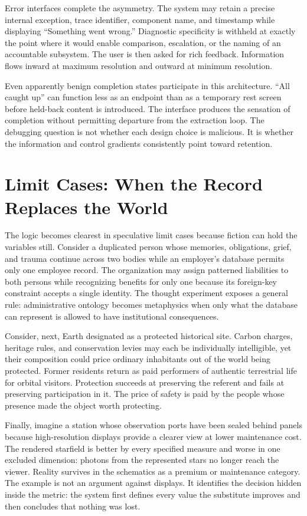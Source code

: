 \documentclass[11pt]{article}
\begin{document}
Error interfaces complete the asymmetry. The system may retain a precise internal exception, trace identifier, component name, and timestamp while displaying \enquote{Something went wrong.} Diagnostic specificity is withheld at exactly the point where it would enable comparison, escalation, or the naming of an accountable subsystem. The user is then asked for rich feedback. Information flows inward at maximum resolution and outward at minimum resolution.

Even apparently benign completion states participate in this architecture. \enquote{All caught up} can function less as an endpoint than as a temporary rest screen before held-back content is introduced. The interface produces the sensation of completion without permitting departure from the extraction loop. The debugging question is not whether each design choice is malicious. It is whether the information and control gradients consistently point toward retention.

\section{Limit Cases: When the Record Replaces the World}

The logic becomes clearest in speculative limit cases because fiction can hold the variables still. Consider a duplicated person whose memories, obligations, grief, and trauma continue across two bodies while an employer's database permits only one employee record. The organization may assign patterned liabilities to both persons while recognizing benefits for only one because its foreign-key constraint accepts a single identity. The thought experiment exposes a general rule: administrative ontology becomes metaphysics when only what the database can represent is allowed to have institutional consequences.

Consider, next, Earth designated as a protected historical site. Carbon charges, heritage rules, and conservation levies may each be individually intelligible, yet their composition could price ordinary inhabitants out of the world being protected. Former residents return as paid performers of authentic terrestrial life for orbital visitors. Protection succeeds at preserving the referent and fails at preserving participation in it. The price of safety is paid by the people whose presence made the object worth protecting.

Finally, imagine a station whose observation ports have been sealed behind panels because high-resolution displays provide a clearer view at lower maintenance cost. The rendered starfield is better by every specified measure and worse in one excluded dimension: photons from the represented stars no longer reach the viewer. Reality survives in the schematics as a premium or maintenance category. The example is not an argument against displays. It identifies the decision hidden inside the metric: the system first defines every value the substitute improves and then concludes that nothing was lost.
\end{document}
